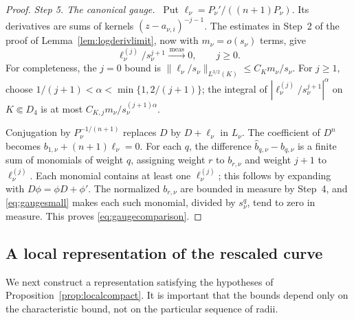 \documentclass[11pt,letterpaper,reqno]{amsart}
\theoremstyle{remark}
\numberwithin{equation}{section}
\newcommand{\convmeas}{\xrightarrow{\,\mathrm{meas}\,}}
\newcommand{\step}[1]{\medskip\noindent\emph{#1}\ }
\begin{document}
\begin{proof}
\step{Step 5. The canonical gauge.}
Put $\ell_\nu=P_\nu'/((n+1)P_\nu)$. Its derivatives are sums of kernels
$(z-a_{\nu,i})^{-j-1}$. The estimates in Step~2 of the proof of
Lemma~\ref{lem:logderivlimit}, now with $m_\nu=o(s_\nu)$ terms, give
\begin{equation}\label{eq:gaugesmall}
 \ell_\nu^{(j)}/s_\nu^{j+1}\convmeas0,\qquad j\ge0.
\end{equation}
For completeness, the $j=0$ bound is
$\|\ell_\nu/s_\nu\|_{L^{3/2}(K)}\le C_Km_\nu/s_\nu$.
For $j\ge1$, choose $1/(j+1)<\alpha<\min\{1,2/(j+1)\}$; the integral of
$|\ell_\nu^{(j)}/s_\nu^{j+1}|^\alpha$ on $K\Subset D_4$ is at most
$C_{K,j}m_\nu/s_\nu^{(j+1)\alpha}$.

Conjugation by $P_\nu^{-1/(n+1)}$ replaces $D$ by $D+\ell_\nu$ in $L_\nu$.
The coefficient of $D^{n}$ becomes $b_{1,\nu}+(n+1)\ell_\nu=0$.
For each $q$, the difference $\widehat b_{q,\nu}-b_{q,\nu}$ is a finite
sum of monomials of weight $q$, assigning weight $r$ to $b_{r,\nu}$ and
weight $j+1$ to $\ell_\nu^{(j)}$. Each monomial contains at least one
$\ell_\nu^{(j)}$; this follows by expanding with $D\phi=\phi D+\phi'$.
The normalized $b_{r,\nu}$ are bounded in measure by Step~4, and
\eqref{eq:gaugesmall} makes each such monomial, divided by $s_\nu^q$, tend
to zero in measure. This proves \eqref{eq:gaugecomparison}.
\end{proof}

\subsection{A local representation of the rescaled curve}

We next construct a representation satisfying the hypotheses of
Proposition~\ref{prop:localcompact}. It is important that the bounds depend
only on the characteristic bound, not on the particular sequence of radii.
\end{document}
